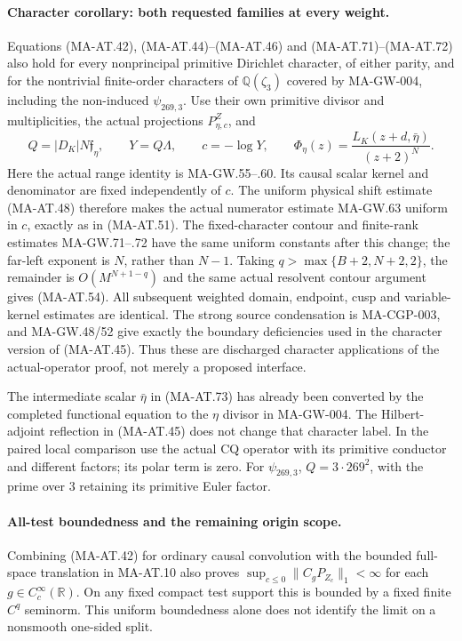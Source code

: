 \paragraph{Character corollary: both requested families at every weight.}
Equations (MA-AT.42), (MA-AT.44)--(MA-AT.46) and
(MA-AT.71)--(MA-AT.72) also hold for every nonprincipal primitive
Dirichlet character, of either parity, and for the nontrivial
finite-order characters of \(\mathbb Q(\zeta_3)\) covered by
MA-GW-004, including the non-induced \(\psi_{269,3}\).
Use their own primitive divisor and multiplicities, the actual
projections \(P_{\eta,c}^Z\), and
\[
 Q=|D_K|N\mathfrak f_\eta,\qquad
 Y=Q\Lambda,\qquad c=-\log Y,\qquad
 \Phi_\eta(z)=\frac{L_K(z+d,\bar\eta)}{(z+2)^N}.
 \tag{MA-AT.73}
\]
Here the actual range identity is MA-GW.55--.60.
Its causal scalar kernel and denominator are fixed independently
of \(c\).  The uniform physical shift estimate (MA-AT.48)
therefore makes the actual numerator estimate MA-GW.63 uniform
in \(c\), exactly as in (MA-AT.51).
The fixed-character contour and finite-rank estimates
MA-GW.71--.72 have the same uniform constants after this change;
the far-left exponent is \(N\), rather than \(N-1\).
Taking \(q>\max\{B+2,N+2,2\}\), the remainder is
\(O(M^{N+1-q})\) and the same actual resolvent contour argument
gives (MA-AT.54).
All subsequent weighted domain, endpoint, cusp and variable-kernel
estimates are identical.  The strong source condensation is
MA-CGP-003, and MA-GW.48/52 give exactly the boundary deficiencies
used in the character version of (MA-AT.45).
Thus these are discharged character applications of the
actual-operator proof, not merely a proposed interface.

The intermediate scalar \(\bar\eta\) in (MA-AT.73) has already
been converted by the completed functional equation to the
\(\eta\) divisor in MA-GW-004.  The Hilbert-adjoint reflection
in (MA-AT.45) does not change that character label.
In the paired local comparison use the actual CQ operator
with its primitive conductor and different factors; its polar
term is zero.  For \(\psi_{269,3}\), \(Q=3\cdot269^2\), with
the prime over \(3\) retaining its primitive Euler factor.

\paragraph{All-test boundedness and the remaining origin scope.}
Combining (MA-AT.42) for ordinary causal convolution with the
bounded full-space translation in MA-AT.10 also proves
\(\sup_{c\le0}\|C_gP_{Z_c}\|_1<\infty\) for each
\(g\in C_c^\infty(\mathbb R)\).
On any fixed compact test support this is bounded by a fixed
finite \(C^q\) seminorm.  This uniform boundedness alone does not
identify the limit on a nonsmooth one-sided split.

